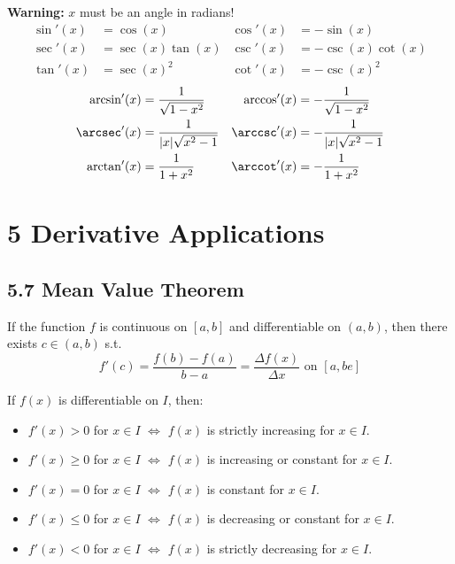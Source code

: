 \begin{theorem}\leavevmode\newline
  \textbf{Warning:} $x$ must be an angle in radians!
  \[\begin{aligned}
    \sin'(x) &= \cos(x) &
    \cos'(x) &= -\sin(x) \\
    \sec'(x) &= \sec(x)\tan(x) &
    \csc'(x) &= -\csc(x)\cot(x) \\
    \tan'(x) &= \sec(x)^2 &
    \cot'(x) &= -\csc(x)^2
  \end{aligned}\]
  \[\begin{aligned}
    \arcsin'(x) &= \frac{1}{\sqrt{1-x^2}} &
    \arccos'(x) &= -\frac{1}{\sqrt{1-x^2}} \\
    \arcsec'(x) &= \frac{1}{|x|\sqrt{x^2-1}} &
    \arccsc'(x) &= -\frac{1}{|x|\sqrt{x^2-1}} \\
    \arctan'(x) &= \frac{1}{1+x^2} &
    \arccot'(x) &= -\frac{1}{1+x^2}
  \end{aligned}\]
\end{theorem}

\section*{5 Derivative Applications}

\subsection*{5.7 Mean Value Theorem}

\begin{theorem}
  If the function $f$ is continuous on $[a, b]$ and differentiable on $(a, b)$, then there exists $c \in (a, b)$ s.t.
  \[
    f'(c) = \frac{f(b) - f(a)}{b - a} = \frac{\Delta f(x)}{\Delta x} \text{ on } [a, be]
  \]
\end{theorem}

\begin{theorem}
  If $f(x)$ is differentiable on $I$, then:
  \begin{itemize}
    \item $f'(x) > 0$ for $x \in I$ $\iff$ $f(x)$ is strictly increasing for $x \in I$.
    \item $f'(x) \geq 0$ for $x \in I$ $\iff$ $f(x)$ is increasing or constant for $x \in I$.
    \item $f'(x) = 0$ for $x \in I$ $\iff$ $f(x)$ is constant for $x \in I$.
    \item $f'(x) \leq 0$ for $x \in I$ $\iff$ $f(x)$ is decreasing or constant for $x \in I$.
    \item $f'(x) < 0$ for $x \in I$ $\iff$ $f(x)$ is strictly decreasing for $x \in I$.
  \end{itemize}
\end{theorem}

